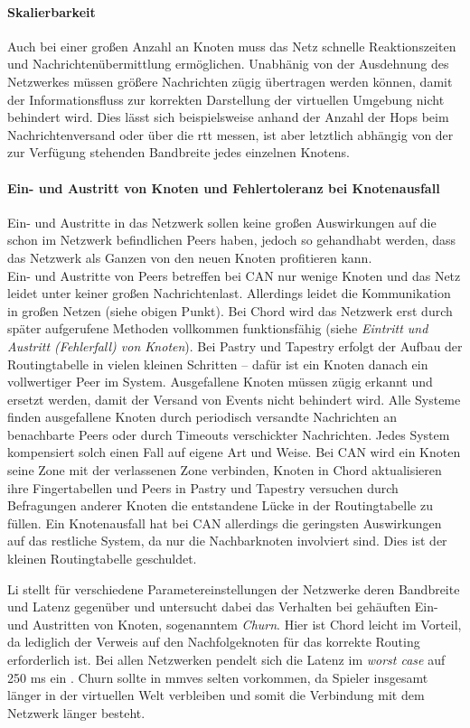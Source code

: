 \paragraph{Skalierbarkeit} Auch bei einer großen Anzahl an Knoten muss das Netz schnelle Reaktionszeiten und Nachrichtenübermittlung ermöglichen. Unabhänig von der Ausdehnung des Netzwerkes müssen größere Nachrichten zügig übertragen werden können, damit der Informationsfluss zur korrekten Darstellung der virtuellen Umgebung nicht behindert wird. Dies lässt sich beispielsweise anhand der Anzahl der Hops beim Nachrichtenversand oder über die \ac{rtt} messen, ist aber letztlich abhängig von der zur Verfügung stehenden Bandbreite jedes einzelnen Knotens.

\paragraph{Ein- und Austritt von Knoten und Fehlertoleranz bei Knotenausfall} Ein- und Austritte in das Netzwerk sollen keine großen Auswirkungen auf die schon im Netzwerk befindlichen Peers haben, jedoch so gehandhabt werden, dass das Netzwerk als Ganzen von den neuen Knoten profitieren kann.\\
Ein- und Austritte von Peers betreffen bei CAN nur wenige Knoten und das Netz leidet unter keiner großen Nachrichtenlast. Allerdings leidet die Kommunikation in großen Netzen (siehe obigen Punkt). Bei Chord wird das Netzwerk erst durch später aufgerufene Methoden vollkommen funktionsfähig (siehe \emph{Eintritt und Austritt (Fehlerfall) von Knoten}). Bei Pastry und Tapestry erfolgt der Aufbau der Routingtabelle in vielen kleinen Schritten -- dafür ist ein Knoten danach ein vollwertiger Peer im System. Ausgefallene Knoten müssen zügig erkannt und ersetzt werden, damit der Versand von Events nicht behindert wird. Alle Systeme finden ausgefallene Knoten durch periodisch versandte Nachrichten an benachbarte Peers oder durch Timeouts verschickter Nachrichten. Jedes System kompensiert solch einen Fall auf eigene Art und Weise. Bei CAN wird ein Knoten seine Zone mit der verlassenen Zone verbinden, Knoten in Chord aktualisieren ihre Fingertabellen und Peers in Pastry und Tapestry versuchen durch Befragungen anderer Knoten die entstandene Lücke in der Routingtabelle zu füllen. Ein Knotenausfall hat bei CAN allerdings die geringsten Auswirkungen auf das restliche System, da nur die Nachbarknoten involviert sind. Dies ist der kleinen Routingtabelle geschuldet.

Li stellt für verschiedene Parametereinstellungen der Netzwerke deren Bandbreite und Latenz gegenüber und untersucht dabei das Verhalten bei gehäuften Ein- und Austritten von Knoten, sogenanntem \emph{Churn}. Hier ist Chord leicht im Vorteil, da lediglich der Verweis auf den Nachfolgeknoten für das korrekte Routing erforderlich ist. Bei allen Netzwerken pendelt sich die Latenz im \emph{worst case} auf 250 ms ein \cite{Li2004Comparing}. Churn sollte in \acp{mmve} selten vorkommen, da Spieler insgesamt länger in der virtuellen Welt verbleiben und somit die Verbindung mit dem Netzwerk länger besteht.

